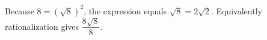 Because $8=(\sqrt8)^2$, the expression equals $\sqrt8=\boxed{2\sqrt2}$. Equivalently rationalization gives $\dfrac{8\sqrt8}{8}$.
